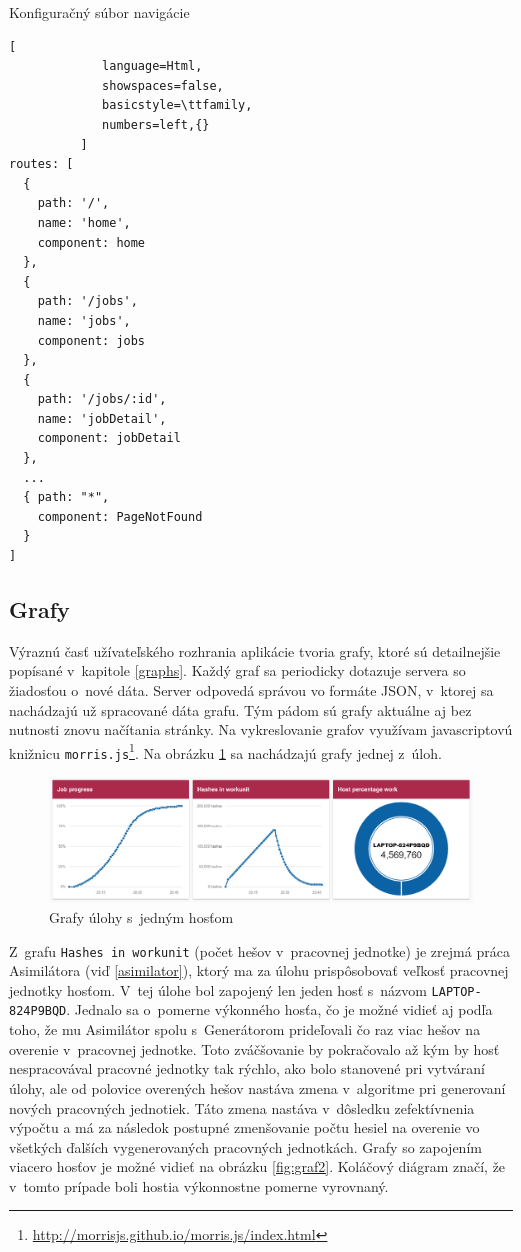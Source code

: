 \documentclass[slovak]{fitthesis}
\begin{document}
\begin{algorithm}[H]
  \caption{Konfiguračný súbor navigácie}
  \label{routerConfig}
  \begin{lstlisting}[
             language=Html,
             showspaces=false,
             basicstyle=\ttfamily,
             numbers=left,{}
          ]
routes: [
  {
    path: '/',
    name: 'home',
    component: home
  },
  {
    path: '/jobs',
    name: 'jobs',
    component: jobs
  },
  {
    path: '/jobs/:id',
    name: 'jobDetail',
    component: jobDetail
  },
  ...
  { path: "*",
    component: PageNotFound
  }
]
  \end{lstlisting}
\end{algorithm}


\subsection{Grafy}
Výraznú časť užívateľského rozhrania aplikácie tvoria grafy, ktoré sú detailnejšie popísané v~kapitole \ref{graphs}. Každý graf sa periodicky dotazuje servera so žiadosťou o~nové dáta. Server odpovedá správou vo formáte JSON, v~ktorej sa nachádzajú už spracované dáta grafu. Tým pádom sú grafy aktuálne aj bez nutnosti znovu načítania stránky. Na vykreslovanie grafov využívam javascriptovú knižnicu \texttt{morris.js}\footnote{\url{http://morrisjs.github.io/morris.js/index.html}}. Na obrázku \ref{fig:graf1} sa nachádzajú grafy jednej z~úloh.
\begin{figure}[H]
    \centering
    \includegraphics[scale=0.53]{obrazky/graf1.PNG}
    \caption{Grafy úlohy s~jedným hosťom}
    \label{fig:graf1}
\end{figure} 
Z~grafu \texttt{Hashes in workunit} (počet hešov v~pracovnej jednotke) je zrejmá práca Asimilátora (viď \ref{asimilator}), ktorý ma za úlohu prispôsobovať veľkosť pracovnej jednotky hosťom. V~tej úlohe bol zapojený len jeden hosť s~názvom \texttt{LAPTOP-824P9BQD}. Jednalo sa o~pomerne výkonného hosťa, čo je možné vidieť aj podľa toho, že mu Asimilátor spolu s~Generátorom prideľovali čo raz viac hešov na overenie v~pracovnej jednotke. Toto zváčšovanie by pokračovalo až kým by hosť nespracovával pracovné jednotky tak rýchlo, ako bolo stanovené pri vytváraní úlohy, ale od polovice overených hešov nastáva zmena v~algoritme pri generovaní nových pracovných jednotiek. Táto zmena nastáva v~dôsledku zefektívnenia výpočtu a má za následok postupné zmenšovanie počtu hesiel na overenie vo všetkých ďalších vygenerovaných pracovných jednotkách.  Grafy so zapojením viacero hosťov je možné vidieť na obrázku \ref{fig:graf2}. Koláčový diágram značí, že v~tomto prípade boli hostia výkonnostne pomerne vyrovnaný. 
\end{document}
